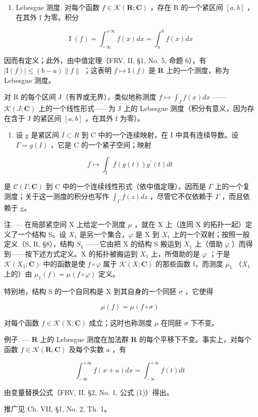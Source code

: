 \begin{enumerate}
\def\labelenumi{\Roman{enumi}.}
\setcounter{enumi}{1}
\tightlist
\item
  Lebesgue 测度. 对每个函数 \(f \in \mathcal{K}(\mathbf{R}; \mathbf{C})\) ，存在 R 的一个紧区间 \([a, b]\) ，在其外 f 为零。积分
\end{enumerate}

\[
\operatorname{I} (f) = \int_ {- \infty} ^ {+ \infty} f (x) d x = \int_ {a} ^ {b} f (x) d x
\]

因而有定义；此外，由中值定理（FRV, II, §1, No. 5, 命题 6），有 \(|\mathrm{I}(f)| \leqslant (b - a) \| f \|\) ；这表明 \(f \mapsto \mathrm{I}(f)\) 是 \(\mathbf{R}\) 上的一个测度，称为 Lebesgue 测度。

对 R 的每个区间 J（有界或无界），类似地称测度 \(f \mapsto \int_{J} f(x) dx\) ——\(\mathcal{K}(J; \mathbf{C})\) 上的一个线性形式——为 J 上的 Lebesgue 测度（积分有意义，因为存在含于 J 的紧区间 \([a, b]\) ，在其外 f 为零）。

\begin{enumerate}
\def\labelenumi{\Roman{enumi}.}
\setcounter{enumi}{2}
\tightlist
\item
  设 g 是紧区间 \(I \subset R\) 到 C 中的一个连续映射，在 I 中具有连续导数。设 \(\Gamma = g(I)\) ，它是 C 的一个紧子空间；映射
\end{enumerate}

\[
f \mapsto \int_ {\mathrm{I}} f (g (t)) g ^ {\prime} (t) d t
\]

是 \(\mathcal{C}(\Gamma;\mathbf{C})\) 到 C 中的一个连续线性形式（依中值定理），因而是 \(\Gamma\) 上的一个复测度；关于这一测度的积分也写作 \(\int_{\Gamma} f(z) dz\) ，尽管它不仅依赖于 \(\Gamma\) ，而且依赖于 g。

注. --- 在局部紧空间 X 上给定一个测度 \(\mu\) ，就在 X 上（连同 X 的拓扑一起）定义了一个结构 S。设 \(X_{1}\) 是另一个集合，\(\varphi\) 是 X 到 \(X_{1}\) 上的一个双射；按照一般定义（S, R, §8），结构 \(S_{1}\) ——它由把 X 的结构 S 搬运到 \(X_{1}\) 上（借助 \(\varphi\) ）而得到——按下述方式定义。X 的拓扑被搬运到 \(X_{1}\) 上，所借助的是 \(\varphi\) ；于是 \(\mathcal{K}(X_{1};\mathbf{C})\) 中的函数是使 \(f \circ \varphi\) 属于 \(\mathcal{K}(X;\mathbf{C})\) 的那些函数 f，而测度 \(\mu_{1}\) （\(X_{1}\) 上的）由 \(\mu_{1}(f) = \mu(f \circ \varphi)\) 定义。

特别地，结构 S 的一个自同构是 X 到其自身的一个同胚 \(\sigma\) ，它使得

\[
\mu (f) = \mu (f \circ \sigma)
\]

对每个函数 \(f \in \mathcal{K}(\mathrm{X};\mathbf{C})\) 成立；这时也称测度 \(\mu\) 在同胚 \(\sigma\) 下不变。

例子. --- \(\mathbf{R}\) 上的 Lebesgue 测度在加法群 \(\mathbf{R}\) 的每个平移下不变。事实上，对每个函数 \(f \in \mathcal{K}(\mathbf{R}; \mathbf{C})\) 及每个实数 \(a\) ，有

\[
\int_ {- \infty} ^ {+ \infty} f (x + a) d x = \int_ {- \infty} ^ {+ \infty} f (t) d t
\]

由变量替换公式（FRV, II, §2, No. 1, 公式 (1)）得出。

推广见 Ch. VII, §1, No. 2, Th. 1。

